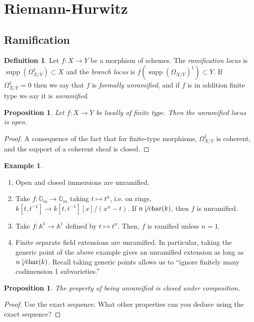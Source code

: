 \documentclass[10pt]{article}
\newtheorem{prop}[thm]{Proposition}
\theoremstyle{definition}
\newtheorem{exmp}[thm]{Example}
\newtheorem{defn}[thm]{Definition}
\DeclareMathOperator{\supp}{supp}
\newcommand{\G}{\mathbb{G}}
\begin{document}
\newpage


\section{Riemann-Hurwitz}

\subsection{Ramification}

\begin{defn}
Let $f: X \rightarrow Y$ be a morphism of schemes.  The \emph{ramification locus} is $\supp(\Omega_{X/Y}^1) \subset X$ and the \emph{branch locus} is $f(\supp(\Omega_{X/Y})^1) \subset Y$.  If $\Omega^1_{X/Y} = 0$ then we say that $f$ is \emph{formally unramified}, and if $f$ is in addition finite type we say it is \emph{unramified}.
\end{defn}

\begin{prop}
Let $f: X \rightarrow Y$ be locally of finite type.  Then the unramified locus is open.
\end{prop}
\begin{proof}
A consequence of the fact that for finite-type morphisms, $\Omega^1_{X/Y}$ is coherent, and the support of a coherent sheaf is closed.
\end{proof}

\begin{exmp}
\begin{enumerate}
\item Open and closed immersions are unramified.
\item Take $f: \G_m \rightarrow \G_m$ taking $t \mapsto t^n$, i.e. on rings, $k[t,t^{-1}] \rightarrow k[t,t^{-1}][x]/(x^n - t)$.  If $n \not\mid \mathrm{char}(k)$, then $f$ is unramified.
\item Take $f: \mathbb{A}^1 \rightarrow \mathbb{A}^1$ defined by $t \mapsto t^n$. Then, $f$ is ramified unless $n=1$.
\item Finite separate field extensions are unramified.  In particular, taking the generic point of the above example gives an unramified extension as long as $n \not\mid \mathrm{char}(k)$.  Recall taking generic points allows us to ``ignore finitely many codimension 1 subvarieties.''
\end{enumerate}
\end{exmp}

\begin{prop}
The property of being unramified is closed under composition.
\end{prop}
\begin{proof}
Use the exact sequence.  What other properties can you deduce using the exact sequence?
\end{proof}
\end{document}
